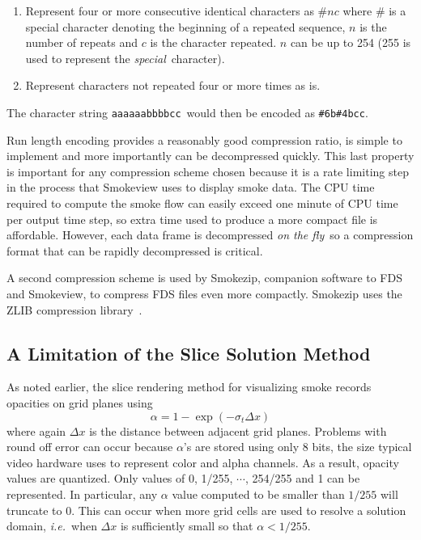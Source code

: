 \begin{enumerate}
\item Represent four or more consecutive identical characters as $\# n c$ where $\#$ is a special character denoting the beginning
of a repeated sequence, $n$ is the number of repeats and $c$ is the character repeated.  $n$ can be up to 254 (255 is used to
represent the {\em special}\ character). \item Represent characters not repeated four or more times as is.
\end{enumerate}

The character string {\tt aaaaaabbbbcc}\ would then be encoded as {\tt \#6b\#4bcc}.

Run length encoding provides a reasonably good compression ratio, is simple to implement and more importantly can be decompressed quickly. This last property is important for any compression scheme chosen because it is a rate limiting step in the process that Smokeview uses to display smoke data. The CPU time required to compute the smoke flow can easily exceed one minute of CPU time
per output time step, so extra time used to produce a more compact file is affordable. However, each data frame is decompressed {\em on the fly}\ so a compression format that can be rapidly decompressed is critical.

A second compression scheme is used by Smokezip, companion software to FDS and Smokeview, to compress FDS files even more compactly.  Smokezip uses the ZLIB compression library~\cite{ZLIB}.


\subsection{A Limitation of the Slice Solution Method}
As noted earlier, the slice rendering method for visualizing smoke records opacities on grid planes using
\begin{equation}
\label{eq:alpha3}
\alpha=1-\exp(-\sigma_t\Delta x)
\end{equation}
where again $\Delta x$ is the distance between adjacent grid planes.  Problems with round off error can occur because $\alpha$'s are stored using only 8 bits, the size typical video hardware uses to represent color and alpha channels.
As a result, opacity values are quantized.  Only values of 0, 1/255, $\cdots$, 254/255 and 1 can be represented.  In particular, any $\alpha$ value computed to be smaller than $1/255$ will truncate to 0.
This can occur when more grid cells are used to resolve a solution domain, {\em i.e.}\ when $\Delta x$ is sufficiently small so that $\alpha<1/255$.

